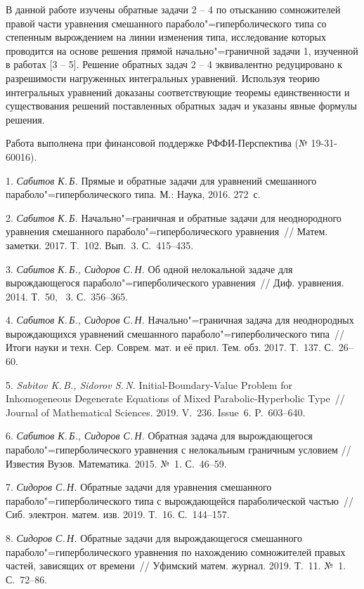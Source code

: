 В данной работе изучены обратные задачи 2 -- 4 по отысканию сомножителей правой части уравнения смешанного параболо"=гиперболического типа со степенным вырождением на линии изменения типа, исследование которых проводится на основе решения прямой начально"=граничной задачи 1, изученной в работах [3 -- 5]. Решение обратных задач 2 -- 4 эквивалентно редуцировано к разрешимости нагруженных интегральных уравнений. Используя теорию интегральных уравнений доказаны соответствующие теоремы единственности и существования решений поставленных обратных задач и указаны явные формулы решения.

Работа выполнена при финансовой поддержке РФФИ-Перспектива (№ 19-31-60016).

\litlist

1. {\it Сабитов К.\,Б.} {Прямые и обратные задачи для уравнений смешанного параболо"=гиперболического типа. М.: Наука, 2016. 272~с.}

2. {\it Сабитов К.\,Б.} {Начально"=граничная и обратные задачи для неоднородного уравнения смешанного параболо"=гиперболического уравнения~// Матем. заметки. 2017. Т.~102. Вып.~3. С.~415--435.}

3. {\it Сабитов К.\,Б., Сидоров С.\,Н.} {Об одной нелокальной задаче для вырождающегося па\-ра\-бо\-ло"=гиперболического уравнения~// Диф. уравнения. 2014. Т.~50, \No~3. С.~356--365.}

4. {\it Сабитов К.\,Б., Сидоров С.\,Н.} {Начально"=граничная задача для неоднородных вырождающихся уравнений смешанного параболо"=гиперболического типа~// Итоги науки и техн. Сер. Соврем. мат. и её прил. Тем. обз. 2017. Т.~137. С.~26--60.}

5. {\it Sabitov K.\,B., Sidorov S.\,N.} {Initial-Boundary-Value Problem for Inhomogeneous Degenerate Equations of Mixed Parabolic-Hyperbolic Type~// Journal of Mathematical Sciences. 2019. V.~236. Issue~6. P.~603--640.}

6. {\it Сабитов К.\,Б., Сидоров С.\,Н.} {Обратная задача для вырождающегося параболо"=гиперболического уравнения с нелокальным граничным условием // Известия Вузов. Математика. 2015. №~1. С.~46--59.}

7. {\it Сидоров С.\,Н.} {Обратные задачи для уравнения смешанного параболо"=гиперболического типа с вырождающейся параболической частью~// Сиб. электрон. матем. изв. 2019. Т.~16. С.~144--157.}

8. {\it Сидоров С.\,Н.} {Обратные задачи для вырождающегося смешанного параболо"=гиперболического уравнения по нахождению сомножителей правых частей, зависящих от времени~// Уфимский матем. журнал. 2019. Т.~11. №~1. С.~72--86.}

